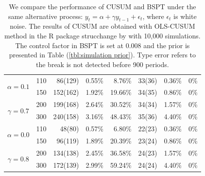 \documentclass[preprint,authoryear,12pt,english]{elsarticle}
\theoremstyle{plain}
\begin{document}
\begin{table}[H]
\begin{minipage}{1\linewidth}
\begin{tabular}{c c r r r r r r }
            \hline
            \multirow{2}{*}{$\alpha=0.1$} & 110        & 86(129)                   & 0.55\%                   & 8.76\%            & 33(36)        & 0.36\%            & 0\%               \\
                                          & 150        & 152(162)                  & 1.92\%                   & 19.66\%           & 34(35)        & 0.86\%            & 0\%               \\
            \multirow{2}{*}{$\gamma=0.7$} & 200        & 199(168)                  & 2.64\%                   & 30.52\%           & 34(34)        & 1.57\%            & 0\%               \\
                                          & 300        & 240(158)                  & 3.16\%                   & 48.43\%           & 35(36)        & 4.40\%            & 0\%               \\
            \hline
            \multirow{2}{*}{$\alpha=0.0$} & 110        & 48(80)                    & 0.57\%                   & 6.80\%            & 22(23)        & 0.36\%            & 0\%               \\
                                          & 150        & 96(119)                   & 1.89\%                   & 20.39\%           & 23(24)        & 0.86\%            & 0\%               \\
            \multirow{2}{*}{$\gamma=0.8$} & 200        & 134(138)                  & 2.45\%                   & 36.58\%           & 24(23)        & 1.57\%            & 0\%               \\
                                          & 300        & 172(139)                  & 2.99\%                   & 59.24\%           & 24(24)        & 4.40\%            & 0\%               \\
            \hline
            \hline
        \end{tabular}
        \protect\caption{We compare the performance of CUSUM and BSPT under the same alternative process: $y_{t} = \alpha + \gamma y_{t-1} + \epsilon_{t}$, where $\epsilon_{t}$ is white noise. The results of CUSUM are obtained with OLS-CUSUM method in the R package strucchange by \cite{Zeileis2015StrucchangeModels} with 10,000 simulations. The control factor in BSPT is set at 0.008 and the prior is presented in Table (\ref{tbl:simulation prior}). Type  error refers to the break is not detected before 900 periods.}
        \label{table:compare CUSUM}
    \end{minipage}
\end{table}
\end{document}
